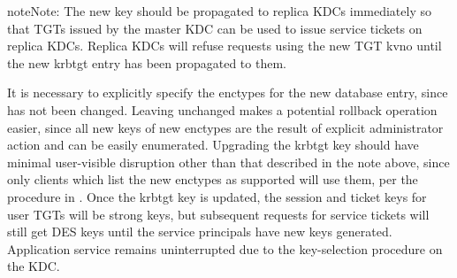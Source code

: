\documentclass[letterpaper,10pt,english]{sphinxmanual}
\begin{document}
%
\begin{sphinxVerbatim}[commandchars=\\\{\}]
\PYG{p}{[} \PYG{p}{]}
 
\PYG{p}{[} \PYG{p}{]}
  
     
   
\end{sphinxVerbatim}

\begin{sphinxadmonition}{note}{Note:}
The new  key should be propagated to replica KDCs
immediately so that TGTs issued by the master KDC can be used to
issue service tickets on replica KDCs.  Replica KDCs will refuse
requests using the new TGT kvno until the new krbtgt entry has
been propagated to them.
\end{sphinxadmonition}

It is necessary to explicitly specify the enctypes for the new database
entry, since  has not been changed.  Leaving
 unchanged makes a potential rollback operation
easier, since all new keys of new enctypes are the result of explicit
administrator action and can be easily enumerated.
Upgrading the krbtgt key should have minimal user-visible disruption other
than that described in the note above, since only clients which list the
new enctypes as supported will use them, per the procedure
in {\hyperref[\detokenize{admin/enctypes:session-key-selection}]{}}.
Once the krbtgt key is updated, the session and ticket keys for user
TGTs will be strong keys, but subsequent requests
for service tickets will still get DES keys until the service principals
have new keys generated.  Application service
remains uninterrupted due to the key-selection procedure on the KDC.
\end{document}
